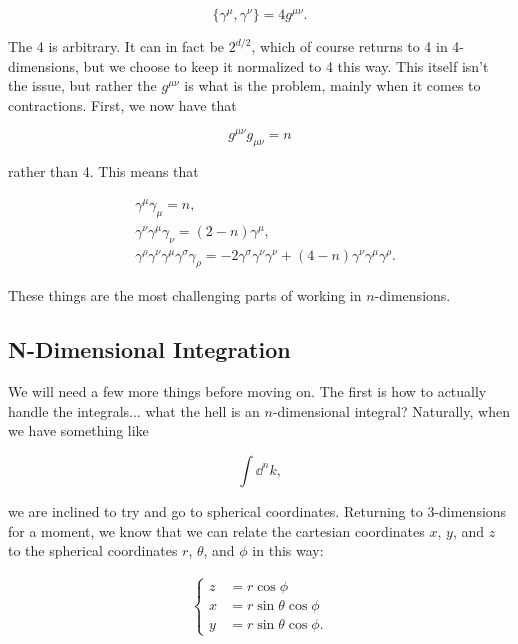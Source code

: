 \documentclass[titlepage]{article}
\begin{document}
\begin{equation}
  \{\gamma^\mu,\gamma^\nu\} = 4g^{\mu\nu}.
\end{equation}

The 4 is arbitrary. It can in fact be $2^{d/2}$, which of course returns to 4 in 4-dimensions, but we choose to keep it normalized to 4 this way. This itself isn't the issue, but rather the $g^{\mu\nu}$ is what is the problem, mainly when it comes to contractions. First, we now have that

\begin{equation}
  g^{\mu\nu}g_{\mu\nu} = n
\end{equation}

rather than 4. This means that

\begin{align}
  &\gamma^\mu\gamma_\mu = n, \\
  &\gamma^\nu\gamma^\mu\gamma_\nu = (2-n)\gamma^\mu, \\
  &\gamma^\rho\gamma^\nu\gamma^\mu\gamma^\sigma\gamma_\rho = -2 \gamma^\sigma\gamma^\nu\gamma^\nu + (4-n)\gamma^\nu\gamma^\mu\gamma^\rho.
\end{align}

These things are the most challenging parts of working in $n$-dimensions.




\subsection{N-Dimensional Integration}

We will need a few more things before moving on. The first is how to actually handle the integrals... what the hell is an $n$-dimensional integral? Naturally, when we have something like

\begin{equation}
  \int \dd^nk,
\end{equation}

we are inclined to try and go to spherical coordinates. Returning to 3-dimensions for a moment, we know that we can relate the cartesian coordinates $x$, $y$, and $z$ to the spherical coordinates $r$, $\theta$, and $\phi$ in this way:

\begin{equation}
  \begin{alignedat}{1}
    \begin{cases}
      z &= r\cos\phi \\
      x &= r\sin\theta\cos\phi \\
      y &= r\sin\theta\cos\phi.
    \end{cases}
  \end{alignedat}
\end{equation}
\end{document}
